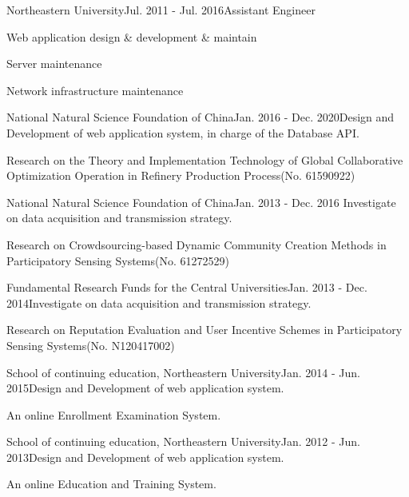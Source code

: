 \documentclass{joel_cv}
\begin{document}
%
%


\begin{sectionContentNormal}{Northeastern University}{Jul. 2011 - Jul. 2016}{Assistant Engineer}
	\item Web application design \& development \& maintain
	\item Server maintenance
	\item Network infrastructure maintenance
\end{sectionContentNormal}



%
%



\begin{sectionContentNormal}{National Natural Science Foundation of China}{Jan. 2016 - Dec. 2020}{Design and Development of web application system, in charge of the Database API.}
	\item Research on the Theory and Implementation Technology of Global Collaborative Optimization Operation in Refinery Production Process(No. 61590922)
\end{sectionContentNormal}

\begin{sectionContentNormal}{National Natural Science Foundation of China}{Jan. 2013 - Dec. 2016}{ Investigate on data acquisition and transmission strategy.}
	\item Research on Crowdsourcing-based Dynamic Community Creation Methods in Participatory Sensing Systems(No. 61272529)
\end{sectionContentNormal}

\begin{sectionContentNormal}{Fundamental Research Funds for the Central Universities}{Jan. 2013 - Dec. 2014}{Investigate on data acquisition and transmission strategy.}
	\item Research on Reputation Evaluation and User Incentive Schemes in Participatory Sensing Systems(No. N120417002)
\end{sectionContentNormal}

\begin{sectionContentNormal}{School of continuing education, Northeastern University}{Jan. 2014 - Jun. 2015}{Design and Development of web application system.}
	\item An online Enrollment Examination System.
\end{sectionContentNormal}

\begin{sectionContentNormal}{School of continuing education, Northeastern University}{Jan. 2012 - Jun. 2013}{Design and Development of web application system.}
	\item An online Education and Training System.
\end{sectionContentNormal}
\end{document}
